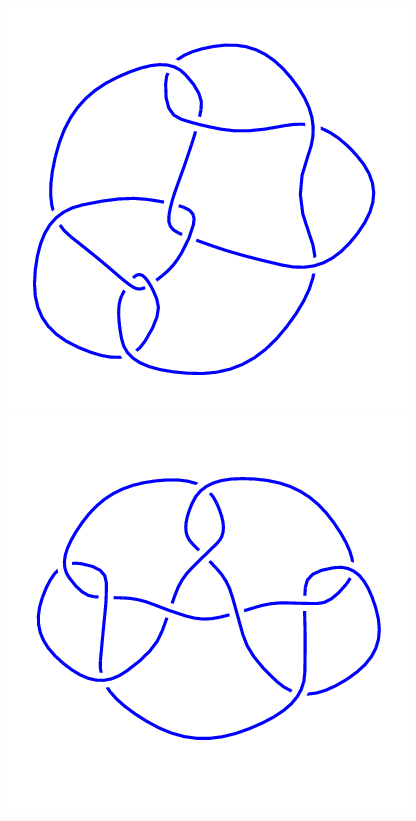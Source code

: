 \begin{figure}[H]
\begin{minipage}[b]{.18\linewidth}
	\end{minipage}
	\begin{minipage}[b]{.18\linewidth}
		\centering
		\includegraphics[width=\linewidth]{../data/10_59.png}
	\end{minipage}
	\begin{minipage}[b]{.18\linewidth}
		\centering
		\includegraphics[width=\linewidth]{../data/10_60.png}

\end{minipage}
\end{figure}
